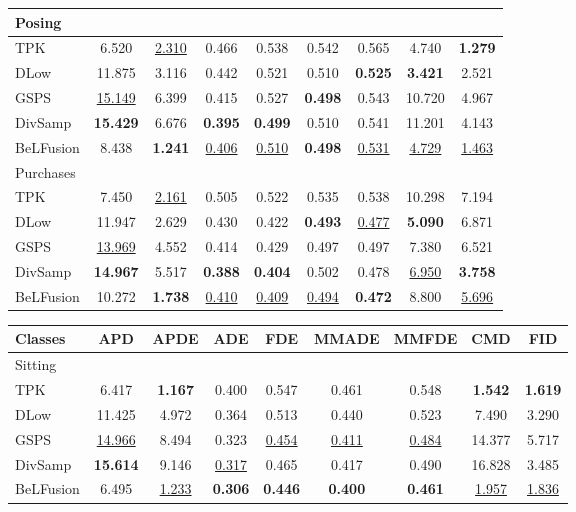 \documentclass[10pt,twocolumn,letterpaper]{article}
\begin{document}
\begin{table*}[t!]
\begin{minipage}{0.495\textwidth}
\begin{tabular}{lcccccccc@{\hskip 2mm}}
Posing \\
\midrule
TPK & 6.520 & \underline{2.310} & 0.466 & 0.538 & 0.542 & 0.565 & 4.740 & \textbf{1.279} \\
DLow & 11.875 & 3.116 & 0.442 & 0.521 & 0.510 & \textbf{0.525} & \textbf{3.421} & 2.521 \\
GSPS & \underline{15.149} & 6.399 & 0.415 & 0.527 & \textbf{0.498} & 0.543 & 10.720 & 4.967 \\
DivSamp & \textbf{15.429} & 6.676 & \textbf{0.395} & \textbf{0.499} & 0.510 & 0.541 & 11.201 & 4.143 \\
BeLFusion & 8.438 & \textbf{1.241} & \underline{0.406} & \underline{0.510} & \textbf{0.498} & \underline{0.531} & \underline{4.729} & \underline{1.463} \\
\midrule

Purchases \\
\midrule
TPK & 7.450 & \underline{2.161} & 0.505 & 0.522 & 0.535 & 0.538 & 10.298 & 7.194 \\
DLow & 11.947 & 2.629 & 0.430 & 0.422 & \textbf{0.493} & \underline{0.477} & \textbf{5.090} & 6.871 \\
GSPS & \underline{13.969} & 4.552 & 0.414 & 0.429 & 0.497 & 0.497 & 7.380 & 6.521 \\
DivSamp & \textbf{14.967} & 5.517 & \textbf{0.388} & \textbf{0.404} & 0.502 & 0.478 & \underline{6.950} & \textbf{3.758} \\
BeLFusion & 10.272 & \textbf{1.738} & \underline{0.410} & \underline{0.409} & \underline{0.494} & \textbf{0.472} & 8.800 & \underline{5.696} \\
\bottomrule
\end{tabular}

\end{minipage} \hfill
\begin{minipage}{0.495\textwidth}
\vspace{-2.15cm}
\begin{tabular}{lcccccccc@{\hskip 2mm}}
\toprule
Classes & APD & APDE  & ADE  & FDE  & MMADE  & MMFDE & CMD & FID\\

\midrule

Sitting \\
\midrule
TPK & 6.417 & \textbf{1.167} & 0.400 & 0.547 & 0.461 & 0.548 & \textbf{1.542} & \textbf{1.619} \\
DLow & 11.425 & 4.972 & 0.364 & 0.513 & 0.440 & 0.523 & 7.490 & 3.290 \\
GSPS & \underline{14.966} & 8.494 & 0.323 & \underline{0.454} & \underline{0.411} & \underline{0.484} & 14.377 & 5.717 \\
DivSamp & \textbf{15.614} & 9.146 & \underline{0.317} & 0.465 & 0.417 & 0.490 & 16.828 & 3.485 \\
BeLFusion & 6.495 & \underline{1.233} & \textbf{0.306} & \textbf{0.446} & \textbf{0.400} & \textbf{0.461} & \underline{1.957} & \underline{1.836} \\
\midrule


\end{tabular}
\end{minipage}
\end{table*}
\end{document}
